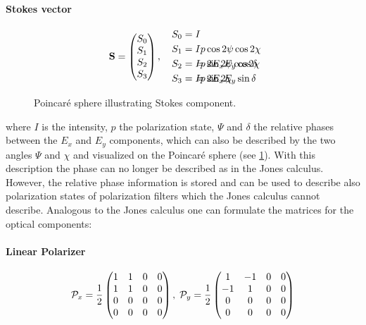 \paragraph{Stokes vector}
\begin{align}
% 
\vec{S} =
\begin{pmatrix} S_0 \\ S_1 \\ S_2 \\ S_3\end{pmatrix} , \quad
% 
\begin{split}
S_0 &= I \\
S_1 &= I p \cos 2\psi \cos 2\chi \\
S_2 &= I p \sin 2\psi \cos 2\chi \\
S_3 &= I p \sin 2\chi
\end{split}
% 
\hspace{-7em}
% 
\begin{split}
& \\
& \\
&= 2 E_x E_y \cos \delta \\
&= 2 E_x E_y \sin \delta
\end{split}
\end{align}
%
\begin{figure}[!t]
\centering
{}
\caption{Poincar\'{e} sphere illustrating Stokes component.}
\label{fig:stokesPoincare}
\end{figure}
%
where $I$ is the intensity, $p$ the polarization state, $\Psi$ and $\delta$ the relative phases between the $E_x$ and $E_y$ components, which can also be described by the two angles $\Psi$ and $\chi$ and visualized on the Poincar\'{e} sphere (see \cref{fig:stokesPoincare}).
With this description the phase can no longer be described as in the Jones calculus.
However, the relative phase information is stored and can be used to describe also polarization states of polarization filters which the Jones calculus cannot describe.
Analogous to the Jones calculus one can formulate the matrices for the optical components:
%
\paragraph{Linear Polarizer}
\begin{align}
\mathcal{P}_x=\frac{1}{2}
\begin{pmatrix}
    1 & 1 & 0 & 0 \\
    1 & 1 & 0 & 0 \\
    0 & 0 & 0 & 0 \\
    0 & 0 & 0 & 0
  \end{pmatrix}
, \;
\mathcal{P}_y=\frac{1}{2}
\begin{pmatrix}
     1 & -1 & 0 & 0 \\
    -1 &  1 & 0 & 0 \\
     0 &  0 & 0 & 0 \\
     0 &  0 & 0 & 0
\end{pmatrix}
\end{align}
%

